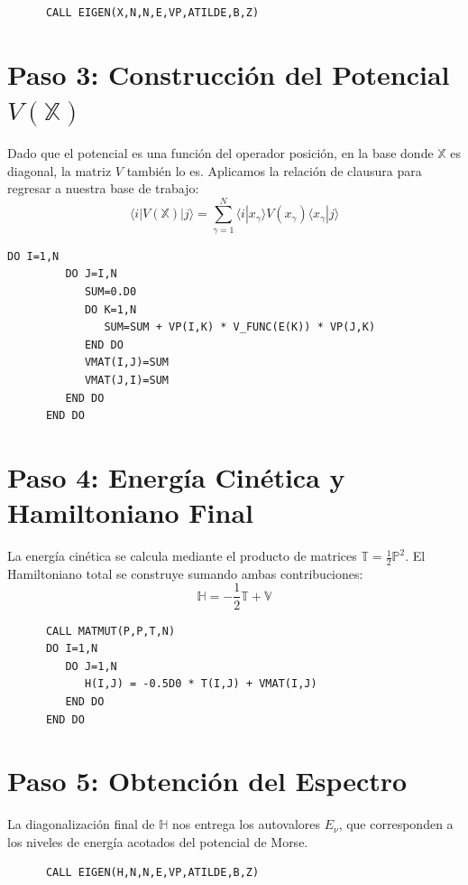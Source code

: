 \documentclass[12pt,a4paper]{article}
\begin{document}
\begin{lstlisting}
      CALL EIGEN(X,N,N,E,VP,ATILDE,B,Z)
\end{lstlisting}

\section{Paso 3: Construcción del Potencial $V(\mathbb{X})$}
Dado que el potencial es una función del operador posición, en la base donde $\mathbb{X}$ es diagonal, la matriz $V$ también lo es. Aplicamos la relación de clausura para regresar a nuestra base de trabajo:
\begin{equation}
    \langle i | V(\mathbb{X}) | j \rangle = \sum_{\gamma=1}^N \langle i | x_\gamma \rangle V(x_\gamma) \langle x_\gamma | j \rangle
\end{equation}

\begin{lstlisting}[caption=Construcción matricial del potencial]
      DO I=1,N
         DO J=I,N
            SUM=0.D0
            DO K=1,N
               SUM=SUM + VP(I,K) * V_FUNC(E(K)) * VP(J,K)
            END DO
            VMAT(I,J)=SUM
            VMAT(J,I)=SUM
         END DO
      END DO
\end{lstlisting}

\section{Paso 4: Energía Cinética y Hamiltoniano Final}
La energía cinética se calcula mediante el producto de matrices $\mathbb{T} = \frac{1}{2}\mathbb{P}^2$. El Hamiltoniano total se construye sumando ambas contribuciones:
\begin{equation}
    \mathbb{H} = -\frac{1}{2} \mathbb{T} + \mathbb{V}
\end{equation}

\begin{lstlisting}
      CALL MATMUT(P,P,T,N)
      DO I=1,N
         DO J=1,N
            H(I,J) = -0.5D0 * T(I,J) + VMAT(I,J)
         END DO
      END DO
\end{lstlisting}

\section{Paso 5: Obtención del Espectro}
La diagonalización final de $\mathbb{H}$ nos entrega los autovalores $E_\nu$, que corresponden a los niveles de energía acotados del potencial de Morse.

\begin{lstlisting}
      CALL EIGEN(H,N,N,E,VP,ATILDE,B,Z)
\end{lstlisting}
\end{document}
